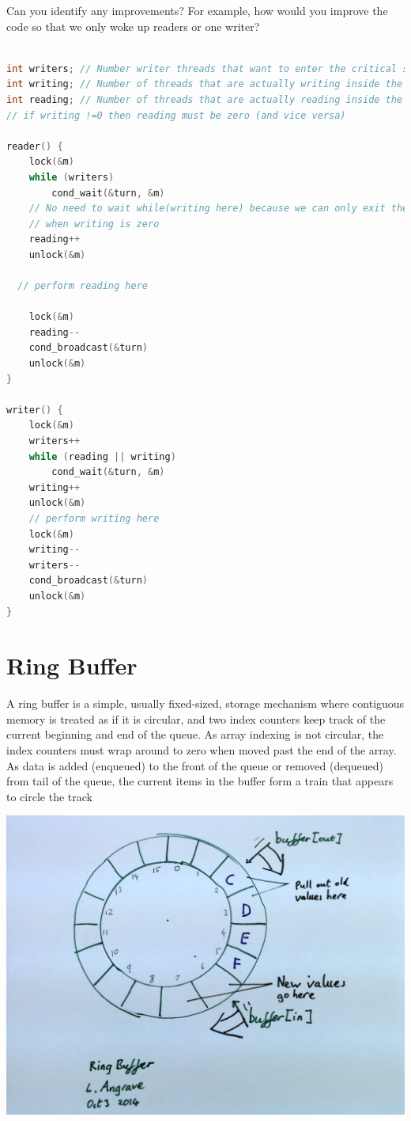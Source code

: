 Can you identify any improvements? For example, how would you improve the code so that we only woke up readers or one writer?

\begin{lstlisting}[language=C]

int writers; // Number writer threads that want to enter the critical section (some or all of these may be blocked)
int writing; // Number of threads that are actually writing inside the C.S. (can only be zero or one)
int reading; // Number of threads that are actually reading inside the C.S.
// if writing !=0 then reading must be zero (and vice versa)

reader() {
    lock(&m)
    while (writers)
        cond_wait(&turn, &m)
    // No need to wait while(writing here) because we can only exit the above loop
    // when writing is zero
    reading++
    unlock(&m)

  // perform reading here

    lock(&m)
    reading--
    cond_broadcast(&turn)
    unlock(&m)
}

writer() {
    lock(&m)  
    writers++  
    while (reading || writing)   
        cond_wait(&turn, &m)  
    writing++  
    unlock(&m)  
    // perform writing here  
    lock(&m)  
    writing--  
    writers--  
    cond_broadcast(&turn)  
    unlock(&m)  
}
\end{lstlisting}

\section{Ring Buffer}\label{Ring Buffer}

A ring buffer is a simple, usually fixed-sized, storage mechanism where contiguous memory is treated as if it is circular, and two index counters keep track of the current beginning and end of the queue. As array indexing is not circular, the index counters must wrap around to zero when moved past the end of the array. As data is added (enqueued) to the front of the queue or removed (dequeued) from tail of the queue, the current items in the buffer form a train that appears to circle the track 

\begin{center}
\includegraphics[width=.5\textwidth]{synchronization/images/ring_buffer.png}
\end{center}

